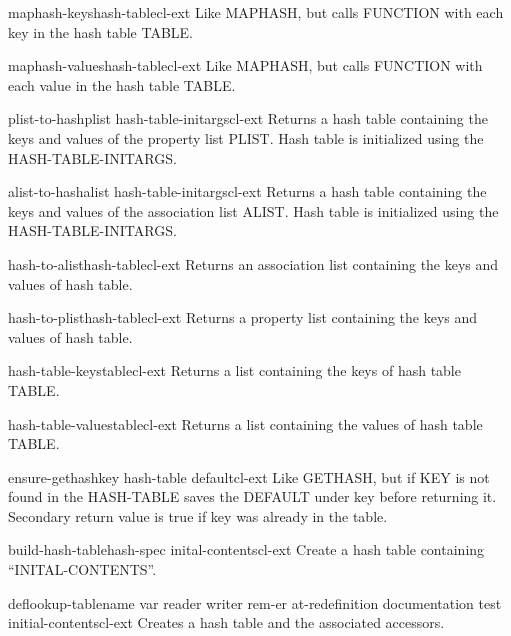 \begin{function}{maphash-keys}{hash-table}{cl-ext}{}
  Like MAPHASH, but calls FUNCTION with each key in the hash table TABLE.
\end{function}

\begin{function}{maphash-values}{hash-table}{cl-ext}{}
  Like MAPHASH, but calls FUNCTION with each value in the hash table TABLE.
\end{function}

\begin{function}{plist-to-hash}{plist \rest hash-table-initargs}{cl-ext}{}
  Returns a hash table containing the keys and values of the property list
PLIST. Hash table is initialized using the HASH-TABLE-INITARGS.
\end{function}

\begin{function}{alist-to-hash}{alist \rest hash-table-initargs}{cl-ext}{}
  Returns a hash table containing the keys and values of the association list
ALIST. Hash table is initialized using the HASH-TABLE-INITARGS.
\end{function}

\begin{function}{hash-to-alist}{hash-table}{cl-ext}{}
  Returns an association list containing the keys and values of hash
  table.
\end{function}

\begin{function}{hash-to-plist}{hash-table}{cl-ext}{}
  Returns a property list containing the keys and values of hash
  table.
\end{function}

\begin{function}{hash-table-keys}{table}{cl-ext}{}
  Returns a list containing the keys of hash table TABLE.
\end{function}

\begin{function}{hash-table-values}{table}{cl-ext}{}
  Returns a list containing the values of hash table TABLE.
\end{function}

\begin{function}{ensure-gethash}{key hash-table \op default}{cl-ext}{}
  Like GETHASH, but if KEY is not found in the HASH-TABLE saves the DEFAULT
under key before returning it. Secondary return value is true if key was
already in the table.
\end{function}

\begin{function}{build-hash-table}{hash-spec inital-contents}{cl-ext}{}
  Create a hash table containing ``INITAL-CONTENTS''.
\end{function}

\begin{macro}{deflookup-table}{name \key var reader writer rem-er at-redefinition documentation test initial-contents}{cl-ext}{}
  Creates a hash table and the associated accessors.
\end{macro}

